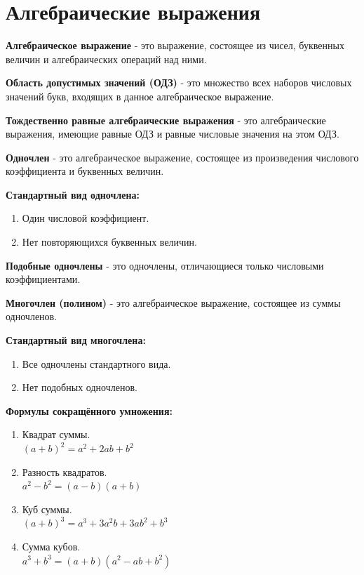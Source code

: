 \documentclass[oneside]{book}
\begin{document}
	\chapter{Алгебраические выражения}
	\textbf{Алгебраическое выражение} - это
	выражение, состоящее из чисел,
	буквенных величин и алгебраических
	операций над ними.

	\textbf{Область допустимых значений (ОДЗ)} - это
	множество всех наборов числовых
	значений букв, входящих
	в данное алгебраическое выражение.

	\textbf{Тождественно равные алгебраические выражения} - это
	алгебраические выражения, имеющие равные ОДЗ и равные
	числовые значения на этом ОДЗ.

	\textbf{Одночлен} - это
	алгебраическое выражение,
	состоящее из произведения числового коэффициента
	и буквенных величин.

	\textbf{Стандартный вид одночлена:}
	\begin{enumerate}
		\item Один числовой коэффициент.
		\item Нет повторяющихся буквенных величин.
	\end{enumerate}

	\textbf{Подобные одночлены} - это
	одночлены, отличающиеся только числовыми
	коэффициентами.

	\textbf{Многочлен (полином)} - это
	алгебраическое выражение,
	состоящее из суммы одночленов.

	\textbf{Стандартный вид многочлена:}
	\begin{enumerate}
		\item Все одночлены стандартного вида.
		\item Нет подобных одночленов.
	\end{enumerate}

    \textbf{Формулы сокращённого умножения:}
    \begin{enumerate}
        \item Квадрат суммы.
        \\
        \begin{math}
            (a + b)^2 = a^2 + 2ab + b^2
        \end{math}

        \item Разность квадратов.
        \\
        \begin{math}
            a^2 - b^2 = (a - b)(a + b)
        \end{math}

        \item Куб суммы.
        \\
        \begin{math}
            (a + b)^3 = a^3 + 3a^2 b + 3ab^2 + b^3
        \end{math}

        \item Сумма кубов.
        \\
        \begin{math}
            a^3 + b^3 = (a + b)(a^2 - ab + b^2)
        \end{math}
    \end{enumerate}
\end{document}
